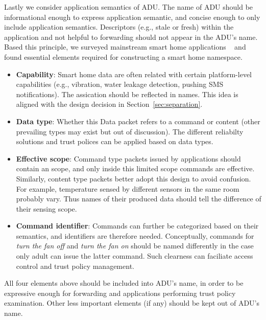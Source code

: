 Lastly we consider application semantics of ADU. 
The name of ADU should be informational enough to express application semantic, and concise enough to only include application semantics.
Descriptors (e.g., stale or fresh) within the application and not helpful to forwarding should not appear in the ADU's name.
Based this principle, we surveyed mainstream smart home applications ~\cite{smartthings, homekit, awsiot, googlenest} and found essential elements required for constructing a smart home namespace.
\begin{itemize}
    \item \textbf{Capability}: Smart home data are often related with certain platform-level capabilities (e.g., vibration, water leakage detection, pushing SMS notifications).
          The assication should be reflected in names. This idea is aligned with the design decision in Section~\ref{sec:separation}.
    \item \textbf{Data type}: Whether this Data packet refers to a command or content (other prevailing types may exist but out of discussion). 
          The different reliabilty solutions and trust polices can be applied based on data types.
    \item \textbf{Effective scope}: Command type packets issued by applications should contain an scope, and only inside this limited scope commands are effective.
          Similarly, content type packets better adopt this design to avoid confusion. 
          For example, temperature sensed by different sensors in the same room probably vary. 
          Thus names of their produced data should tell the difference of their sensing scope.
    \item \textbf{Command identifier}: Commands can further be categorized based on their semantics, and identifiers are therefore needed.
          Conceptually, commands for \textit{turn the fan off} and \textit{turn the fan on} should be named differently in the case only adult can issue the latter command.
          Such clearness can faciliate access control and trust policy management. 
\end{itemize}
All four elements above should be included into ADU's name, in order to be expressive enough for forwarding and applications performing trust policy examination.
Other less important elements (if any) should be kept out of ADU's name.


